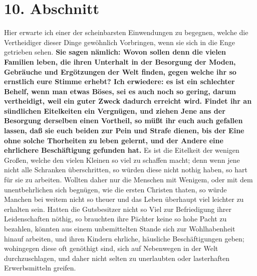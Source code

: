 {\section{10. Abschnitt} \label{kap17_ab10}

 Hier erwarte ich einer der scheinbarsten Einwendungen zu
begegnen, welche die
Vertheidiger dieser Dinge gewöhnlich Vorbringen, wenn sie sich in die Enge
getrieben sehen. \label{ref:17_10_einwand} \textbf{Sie sagen nämlich: Wovon sollen
denn die vielen Familien leben,
die ihren Unterhalt in der Besorgung der Moden, Gebräuche und Ergötzungen der
Welt finden, gegen welche ihr so ernstlich eure Stimme erhebt? Ich erwiedere: es
ist ein schlechter Behelf, wenn man etwas Böses, sei es auch noch so gering,
darum vertheidigt, weil ein guter Zweck dadurch erreicht wird. Findet ihr an
sündlichen Eitelkeiten ein Vergnügen, und ziehen Jene ans der Besorgung
derselben einen Vortheil, so müßt ihr euch auch gefallen lassen, daß sie euch
beiden zur Pein und Strafe dienen, bis der Eine ohne solche Thorheiten zu leben
gelernt, und der Andere eine ehrlichere Beschäftigung gefunden hat.} Es ist die
Eitelkeit der wenigen Großen, welche den vielen Kleinen so viel zu schaffen
macht; denn wenn jene nicht alle Schranken überschritten, so würden diese nicht
nothig haben, so hart für sie zu arbeiten. Wollten daher nur die Menschen mit
Wenigem, oder mit dem unentbehrlichen sich begnügen, wie die ersten Christen
thaten, so würde Manchen bei weitem nicht so theuer und das Leben überhaupt viel
leichter zu erhalten sein. Hatten die Gutsbesitzer nicht so Viel zur
Befriedigung ihrer Leidenschaften nöthig, so brauchten ihre Pächter keine so
hohe Pacht zu bezahlen, könnten aus einem unbemittelten Stande sich zur
Wohlhabenheit hinauf arbeiten, und ihren Kindern ehrliche, häusliche
Beschäftigungen geben; wohingegen diese oft genöthigt sind, sich auf Nebenwegen
in der Welt durchzuschlagen, und daher nicht selten zu unerlaubten oder
lasterhaften Erwerbsmitteln greifen.

\medskip

}
